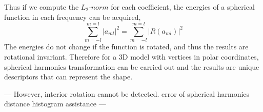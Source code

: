 \begin{enumerate}
Thus if we compute the $L_{2}$-$norm$ for each coefficient, the energies of a spherical function in each frequency can be acquired,
\begin{equation} \label{l2norm}
\sum_{m=-l}^{m=l}|a_{ml}|^{2}=\sum_{m=-l}^{m=l}|R(a_{ml})|^{2}
\end{equation}
The energies do not change if the function is rotated, and thus the results are rotational invariant. Therefore for a 3D model with vertices in polar coordinates, spherical harmonics transformation can be carried out and the results are unique descriptors that can represent the shape. 

---
However, interior rotation cannot be detected. 
error of spherical harmonics
distance histogram assistance
---

\end{enumerate}